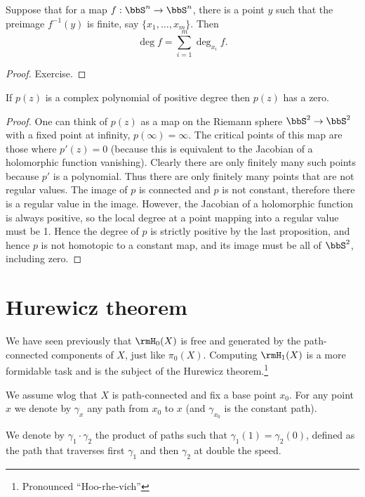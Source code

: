 \begin{prop}\label{prop local degree formula}
    Suppose that for a map $f:\bbS^n\to \bbS^n$, there is a point $y$ such that the preimage $f^{-1}(y)$ is finite, say $\{x_1,\ldots,x_m\}$. Then \[\deg f=\sum_{i=1}^m \deg_{x_i} f.\]
\end{prop}
\begin{proof}
     Exercise.
\end{proof}

\begin{cor}\label{Theorem!Fundamental Theorem of Algebra}
    If $p(z)$ is a complex polynomial of positive degree then $p(z)$ has a zero.
\end{cor}
\begin{proof}
     One can think of $p(z)$ as a map on the Riemann sphere $\bbS^2\to \bbS^2$ with a fixed point at infinity, $p(\infty)=\infty$. The critical points of this map are those where $p'(z)=0$ (because this is equivalent to the Jacobian of a holomorphic function vanishing). Clearly there are only finitely many such points because $p'$ is a polynomial. Thus there are only finitely many points that are not regular values. The image of $p$ is connected and $p$ is not constant, therefore there is a regular value in the image. However, the Jacobian of a holomorphic function is always positive, so the local degree at a point mapping into a regular value must be 1. Hence the degree of $p$ is strictly positive by the last proposition, and hence $p$ is not homotopic to a constant map, and its image must be all of $\bbS^2$, including zero.
\end{proof}



\section{Hurewicz theorem}

We have seen previously that $\rmH_0(X)$ is free and generated by the path-connected components of $X$, just like $\pi_0(X)$. Computing $\rmH_1(X)$ is a more formidable task and is the subject of the Hurewicz theorem.\footnote{Pronounced ``Hoo-rhe-vich''}

We assume \gls{wlog} that $X$ is path-connected and fix a base point $x_0$. For any point $x$ we denote by $\gamma_x$ any path from $x_0$ to $x$ (and $\gamma_{x_0}$ is the constant path).

We denote by $\gamma_1\cdot \gamma_2$ the product of paths such that $\gamma_1(1)=\gamma_2(0)$, defined as the path that traverses first $\gamma_1$ and then $\gamma_2$ at double the speed.

